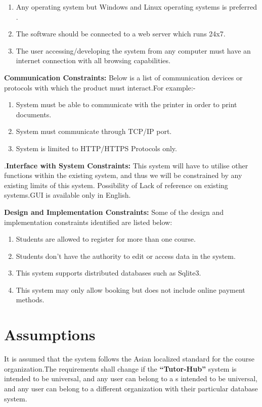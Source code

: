 \begin{enumerate}
\item Any operating system but Windows and Linux operating systems is preferred .
\item The software should be connected to a web server which runs 24x7.
\item The user accessing/developing the system from any computer must have an internet connection with all browsing capabilities.
\end{enumerate}

\textbf{Communication Constraints:} Below is a list of communication devices or protocols with which the product must interact.For example:-

\begin{enumerate}
\item System must be able to communicate with the printer in order to print documents.
\item System must communicate through TCP/IP port.
\item System is limited to HTTP/HTTPS Protocols only.
\end{enumerate}

.\textbf{Interface with System Constraints:} This system will have to utilise other functions within the existing system, and thus we will be constrained by any existing limits of this system. Possibility of Lack of reference on existing systems.GUI is available only in English.

\textbf{Design and Implementation Constraints:} Some of the design and implementation constraints identified are listed below: 

\begin{enumerate}
\item  Students are allowed to register for more than one course.
\item  Students don't have the authority to edit or access data in the system.
\item  This system supports distributed databases such as Sqlite3.
\item This system may only allow booking but does not include online payment methods. 
\end{enumerate}


\section{Assumptions}
It is assumed that the system follows the Asian localized standard for the course organization.The requirements shall change if the \textbf{“Tutor-Hub”} system is intended to be universal, and any user can belong to a s intended to be universal, and any user can belong to a different organization with their particular database system.

